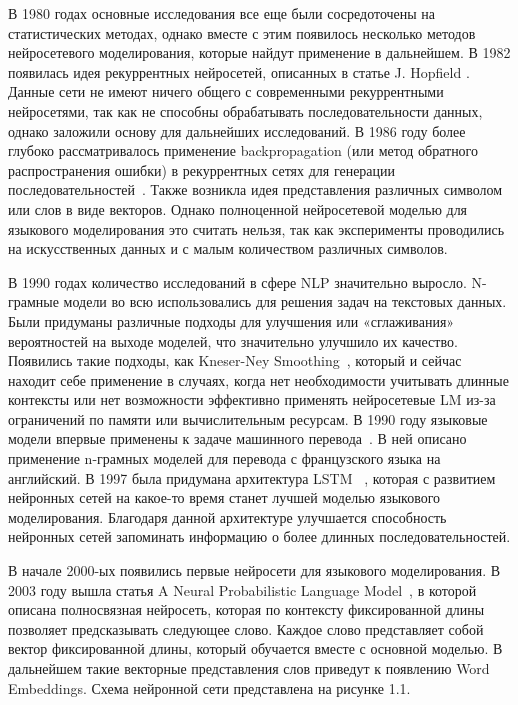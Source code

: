 В 1980 годах основные исследования все еще были сосредоточены на статистических методах, однако вместе с этим появилось несколько методов нейросетевого моделирования, которые найдут применение в дальнейшем. В 1982 появилась идея рекуррентных нейросетей, описанных в статье J. Hopfield \cite{hopfield_rnn}. Данные сети не имеют ничего общего с современными рекуррентными нейросетями, так как не способны обрабатывать последовательности данных, однако заложили основу для дальнейших исследований. В 1986 году более глубоко рассматривалось применение backpropagation (или метод обратного распространения ошибки) в рекуррентных сетях для генерации последовательностей~\cite{rumelhart_backprop}. Также возникла идея представления различных символом или слов в виде векторов. Однако полноценной нейросетевой моделью для языкового моделирования это считать нельзя, так как эксперименты проводились на искусственных данных и с малым количеством различных символов.

В 1990 годах количество исследований в сфере NLP значительно выросло. N-грамные модели во всю использовались для решения задач на текстовых данных. Были придуманы различные подходы для улучшения или «сглаживания» вероятностей на выходе моделей, что значительно улучшило их качество. Появились такие подходы, как Kneser-Ney Smoothing~\cite{kneser_ney}, который и сейчас находит себе применение в случаях, когда нет необходимости учитывать длинные контексты или нет возможности эффективно применять нейросетевые LM из-за ограничений по памяти или вычислительным ресурсам. В 1990 году языковые модели впервые применены к задаче машинного перевода~\cite{mt_first}. В ней описано применение n-грамных моделей для перевода с французского языка на английский. В 1997 была придумана архитектура LSTM ~\cite{lstm}, которая с развитием нейронных сетей на какое-то время станет лучшей моделью языкового моделирования. Благодаря данной архитектуре улучшается способность нейронных сетей запоминать информацию о более длинных последовательностей.

В начале 2000-ых появились первые нейросети для языкового моделирования. В 2003 году вышла статья A Neural Probabilistic Language Model~\cite{first_neural_lm}, в которой описана полносвязная нейросеть, которая по контексту фиксированной длины позволяет предсказывать следующее слово. Каждое слово представляет собой вектор фиксированной длины, который обучается вместе с основной моделью. В дальнейшем такие векторные представления слов приведут к появлению Word Embeddings. Схема нейронной сети представлена на рисунке 1.1.

